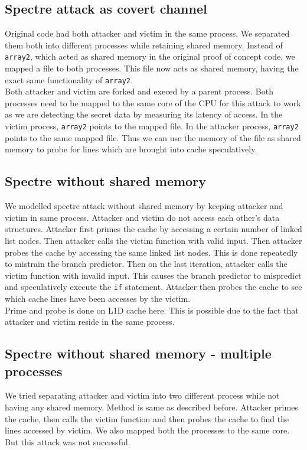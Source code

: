 \subsection{Spectre attack as covert channel}
Original code had both attacker and victim in the same process. We separated them both into different processes while retaining shared memory. Instead of \texttt{array2}, which acted as shared memory in the original proof of concept code, we mapped a file to both processes. This file now acts as shared memory, having the exact same functionality of \texttt{array2}. \\
\indent Both attacker and victim are forked and execed by a parent process. Both processes need to be mapped to the same core of the CPU for this attack to work as we are detecting the secret data by measuring its latency of access. In the victim process, \texttt{array2} points to the mapped file. In the attacker process, \texttt{array2} points to the same mapped file. Thus we can use the memory of the file as shared memory to probe for lines which are brought into cache speculatively.

\subsection{Spectre without shared memory}
We modelled spectre attack without shared memory by keeping attacker and victim in same process. Attacker and victim do not access each other's data structures. Attacker first primes the cache by accessing a certain number of linked list nodes. Then attacker calls the victim function with valid input. Then attacker probes the cache by accessing the same linked list nodes. This is done repeatedly to mistrain the branch predictor. Then on the last iteration, attacker calls the victim function with invalid input. This causes the branch predictor to mispredict and speculatively execute the \texttt{if} statement. Attacker then probes the cache to see which cache lines have been accesses by the victim. \\
\indent Prime and probe is done on L1D cache here. This is possible due to the fact that attacker and victim reside in the same process. 

\subsection{Spectre without shared memory - multiple processes}
We tried separating attacker and victim into two different process while not having any shared memory. Method is same as described before. Attacker primes the cache, then calls the victim function and then probes the cache to find the lines accessed by victim. We also mapped both the processes to the same core. But this attack was not successful.